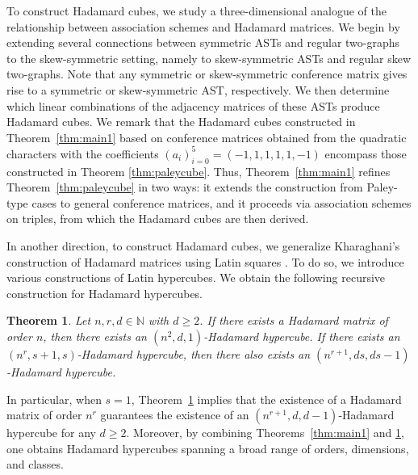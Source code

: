 \documentclass[11pt,oneside]{amsart}
\newtheorem{thm}{Theorem}
\begin{document}
To construct Hadamard cubes, we study a three-dimensional analogue of the relationship between association schemes and Hadamard matrices. We begin by extending several connections between symmetric ASTs and regular two-graphs to the skew-symmetric setting, namely to skew-symmetric ASTs and regular skew two-graphs.
Note that any symmetric or skew-symmetric conference matrix gives rise to a symmetric or skew-symmetric AST, respectively. 
We then determine which linear combinations of the adjacency matrices of these ASTs produce Hadamard cubes.
We remark that the Hadamard cubes constructed in Theorem~\ref{thm:main1} based on conference matrices obtained from the quadratic characters with the coefficients $(a_i)_{i=0}^5=(-1,1,1,1,1,-1)$ encompass those constructed in Theorem \ref{thm:paleycube}. 
Thus, Theorem~\ref{thm:main1} refines Theorem~\ref{thm:paleycube} in two ways: it extends the construction from Paley-type cases to general conference matrices, and it proceeds via association schemes on triples, from which the Hadamard cubes are then derived.

In another direction, to construct Hadamard cubes, we generalize Kharaghani's construction of Hadamard matrices using Latin squares \cite{MR810264}. To do so,
we introduce various constructions of Latin hypercubes. We obtain the following recursive construction for Hadamard hypercubes.
\begin{thm}\label{introthm:hypercube}
Let $n, r, d \in \mathbb{N}$ with $d \geq 2$. If there exists a Hadamard matrix of order $n$, then there exists an $(n^2,d,1)$-Hadamard hypercube. If there exists an $(n^r, s+1, s)$-Hadamard hypercube, then there also exists an $(n^{r+1}, ds, ds-1)$-Hadamard hypercube.
\end{thm}

In particular, when $s = 1$, Theorem~\ref{introthm:hypercube} implies that the existence of a Hadamard matrix of order $n^r$ guarantees the existence of an $(n^{r+1}, d, d-1)$-Hadamard hypercube for any $d\geq 2$. Moreover, by combining Theorems~\ref{thm:main1} and \ref{introthm:hypercube}, one obtains Hadamard hypercubes spanning a broad range of orders, dimensions, and classes.
\end{document}
